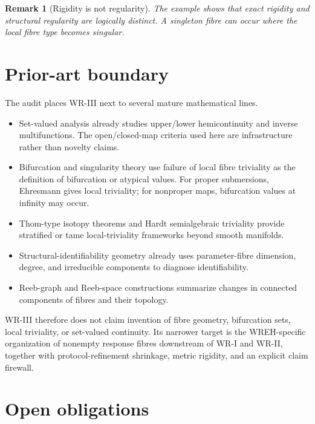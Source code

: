 \documentclass[11pt]{article}
\newtheorem{remark}[definition]{Remark}
\begin{document}
\begin{remark}[Rigidity is not regularity]
The example shows that exact rigidity and structural regularity are logically
distinct. A singleton fibre can occur where the local fibre type becomes
singular.
\end{remark}

\section{Prior-art boundary}

The audit places WR-III next to several mature mathematical lines.

\begin{itemize}
\item Set-valued analysis already studies upper/lower hemicontinuity and
inverse multifunctions. The open/closed-map criteria used here are
infrastructure rather than novelty claims.

\item Bifurcation and singularity theory use failure of local fibre
triviality as the definition of bifurcation or atypical values. For proper
submersions, Ehresmann gives local triviality; for nonproper maps, bifurcation
values at infinity may occur.

\item Thom-type isotopy theorems and Hardt semialgebraic triviality provide
stratified or tame local-triviality frameworks beyond smooth manifolds.

\item Structural-identifiability geometry already uses parameter-fibre
dimension, degree, and irreducible components to diagnose identifiability.

\item Reeb-graph and Reeb-space constructions summarize changes in connected
components of fibres and their topology.
\end{itemize}

WR-III therefore does not claim invention of fibre geometry, bifurcation
sets, local triviality, or set-valued continuity. Its narrower target is the
WREH-specific organization of nonempty response fibres downstream of WR-I and
WR-II, together with protocol-refinement shrinkage, metric rigidity, and an
explicit claim firewall.

\section{Open obligations}
\end{document}
